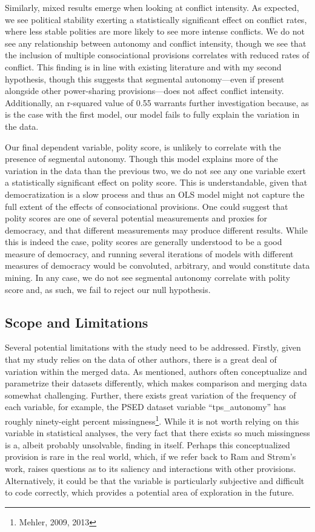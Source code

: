 \documentclass[12pt]{article}
\begin{document}
Similarly, mixed results emerge when looking at conflict intensity. As expected, we see political stability exerting a statistically significant effect on conflict rates, where less stable polities are more likely to see more intense conflicts. We do not see any relationship between autonomy and conflict intensity, though we see that the inclusion of multiple consociational provisions correlates with reduced rates of conflict. This finding is in line with existing literature and with my second hypothesis, though this suggests that segmental autonomy—even if present alongside other power-sharing provisions—does not affect conflict intensity. Additionally, an r-squared value of 0.55 warrants further investigation because, as is the case with the first model, our model fails to fully explain the variation in the data. 

Our final dependent variable, polity score, is unlikely to correlate with the presence of segmental autonomy. Though this model explains more of the variation in the data than the previous two, we do not see any one variable exert a statistically significant effect on polity score. This is understandable, given that democratization is a slow process and thus an OLS model might not capture the full extent of the effects of consociational provisions. One could suggest that polity scores are one of several potential measurements and proxies for democracy, and that different measurements may produce different results. While this is indeed the case, polity scores are generally understood to be a good measure of democracy, and running several iterations of models with different measures of democracy would be convoluted, arbitrary, and would constitute data mining. In any case, we do not see segmental autonomy correlate with polity score and, as such, we fail to reject our null hypothesis.
 
\subsection{Scope and Limitations}
Several potential limitations with the study need to be addressed. Firstly, given that my study relies on the data of other authors, there is a great deal of variation within the merged data. As mentioned, authors often conceptualize and parametrize their datasets differently, which makes comparison and merging data somewhat challenging. Further, there exists great variation of the frequency of each variable, for example, the PSED dataset variable “tps\_autonomy” has roughly ninety-eight percent missingness\footnote{Mehler, 2009, 2013}. While it is not worth relying on this variable in statistical analyses, the very fact that there exists so much missingness is a, albeit probably unsolvable, finding in itself. Perhaps this conceptualized provision is rare in the real world, which, if we refer back to Ram and Strøm’s work, raises questions as to its saliency and interactions with other provisions. Alternatively, it could be that the variable is particularly subjective and difficult to code correctly, which provides a potential area of exploration in the future. 
\end{document}
